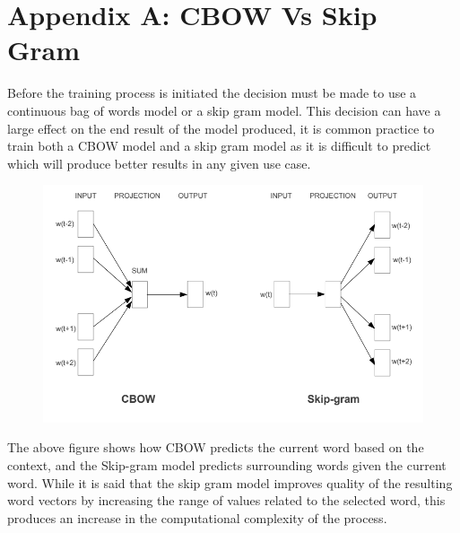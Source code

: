 \pagestyle{plain}
\appendix
\section*{Appendix A: CBOW Vs Skip Gram}
Before the training process is initiated the decision must be made to use a continuous bag of words model or a skip gram model. This decision can have a large effect on the end result of the model produced, it is common practice to train both a CBOW model and a skip gram model as it is difficult to predict which will produce better results in any given use case.
\begin{figure}[H]
\centering
  \includegraphics[width=.9\textwidth]{images/CBW_SG.PNG}
  \label{fig:CBOW_SG}
\end{figure}
\noindent
The above figure shows how CBOW predicts the current word based on the context, and the Skip-gram model predicts surrounding words given the current word. While it is said that the skip gram model improves quality of the resulting word vectors by increasing the range of values related to the selected word, this produces an increase in the computational complexity of the process. \cite{Mikolov}



